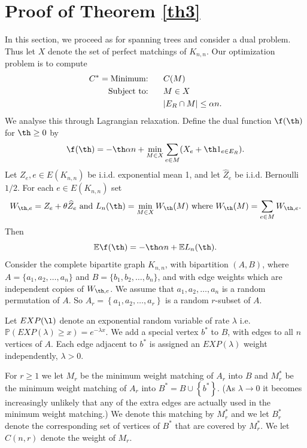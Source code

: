 \documentclass[12pt]{article}
\newcommand{\1}{\textbf{1}}
\def\nn{\nonumber}
\def\a{\alpha} \def\b{\beta} \def\d{\delta} \def\D{\Delta}
\newcommand{\wh}[1]{\widehat{#1}}
\newcommand{\set}[1]{\left\{#1\right\}}
\def\E{\mathbb{E}}
\def\Pr{\mathbb{P}}
\newcommand{\beq}[2]{\begin{equation}\label{#1}#2\end{equation}}
\def\nn{\nonumber}
\begin{document}
\section{Proof of Theorem \ref{th3}}
In this section, we proceed as for spanning trees and consider a dual problem. Thus let $X$ denote the set of perfect matchings of $K_{n,n}$. Our optimization problem is to compute 
\begin{align}
C^*=\text{Minimum:}&\hspace{0.25in} C(M)\label{matchings}\\
\text{Subject to:}&\hspace{0.25in} M\in X\nn\\
&\hspace{0.25in}|E_R\cap M|\leq \a n.\label{M1}
\end{align}
We analyse this through Lagrangian relaxation. Define the dual function $\f(\th)$ for $\th\geq 0$ by
\beq{eqn:phidef3}
{
\f(\th)=-\th\a n+\min_{M\in X}\sum_{e\in M}(X_e+\th1_{e \in E_R}).
}
Let $Z_e, e \in E(K_{n, n})$ be i.i.d. exponential mean 1, and let $\wh Z_e$ be i.i.d. Bernoulli $1/2$. For each $e\in E(K_{n,n})$ set 
\beq{eqn:Wdef}
{
W_{\th,e} = Z_e + \theta \wh Z_e\text{ and }L_n(\th) = \min_{M \in X} W_\th(M)\text{ where }W_\th(M)=\sum_{e \in M} W_{\th,e}.
}
Then
\[
\E\f(\th)=-\th\a n+\E L_n(\th).
\]
Consider the complete bipartite graph $K_{n,n}$, with bipartition $(A,B)$, where $A=\{a_1, a_2,\ldots, a_n\}$ and $B=\{b_1, b_2, \ldots, b_n\}$, and with edge weights which are independent copies of $W_{\th,e}$. We assume that $a_1,a_2,\ldots,a_n$ is a random permutation of $A$. So $A_r=\set{a_1,a_2,\ldots,a_r}$ is a random $r$-subset of $A$. 

Let $EXP(\l)$ denote an exponential random variable of rate $\lambda$ i.e. $\Pr(EXP(\lambda)\geq x)=e^{-\lambda x}$. We add a special vertex $b^*$ to $B$, with edges to all $n$ vertices of $A$. Each edge adjacent to $b^*$ is assigned an $EXP(\lambda)$ weight independently, $\lambda>0$. 

For $r\geq 1$ we let $M_r$ be the minimum weight matching of $A_r$ into $B$ and $M_r^*$  be the minimum weight matching of $A_r$ into $B^*=B\cup \set{b^*}$. (As $\lambda\to 0$ it becomes increasingly unlikely that any of the extra edges are actually used in the minimum weight matching.) We denote this matching by $M_r^*$ and we let $B_r^*$ denote the corresponding set of vertices of $B^*$ that are covered by $M_r^*$. We let $C(n,r)$ denote the weight of $M_r$.
\end{document}

